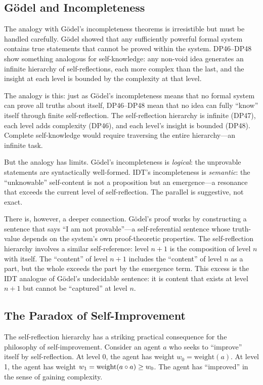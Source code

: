 \subsection{G\"odel and Incompleteness}

The analogy with G\"odel's incompleteness theorems is irresistible but must
be handled carefully.  G\"odel showed that any sufficiently powerful formal
system contains true statements that cannot be proved within the system.
DP46--DP48 show something analogous for self-knowledge: any non-void idea
generates an infinite hierarchy of self-reflections, each more complex than
the last, and the insight at each level is bounded by the complexity at that
level.

The analogy is this: just as G\"odel's incompleteness means that no formal
system can prove all truths about itself, DP46--DP48 mean that no idea can
fully ``know'' itself through finite self-reflection.  The self-reflection
hierarchy is infinite (DP47), each level adds complexity (DP46), and each
level's insight is bounded (DP48).  Complete self-knowledge would require
traversing the entire hierarchy---an infinite task.

But the analogy has limits.  G\"odel's incompleteness is \emph{logical}:
the unprovable statements are syntactically well-formed.  IDT's
incompleteness is \emph{semantic}: the ``unknowable'' self-content is not
a proposition but an emergence---a resonance that exceeds the current level
of self-reflection.  The parallel is suggestive, not exact.

There is, however, a deeper connection.  G\"odel's proof works by constructing
a sentence that says ``I am not provable''---a self-referential sentence whose
truth-value depends on the system's own proof-theoretic properties.  The
self-reflection hierarchy involves a similar self-reference: level $n+1$
is the composition of level $n$ with itself.  The ``content'' of level $n+1$
includes the ``content'' of level $n$ as a part, but the whole exceeds the
part by the emergence term.  This excess is the IDT analogue of G\"odel's
undecidable sentence: it is content that exists at level $n+1$ but cannot be
``captured'' at level $n$.

\subsection{The Paradox of Self-Improvement}

The self-reflection hierarchy has a striking practical consequence for the
philosophy of self-improvement.  Consider an agent $a$ who seeks to ``improve''
itself by self-reflection.  At level 0, the agent has weight $w_0 =
\mathrm{weight}(a)$.  At level 1, the agent has weight $w_1 =
\mathrm{weight}(a \circ a) \geq w_0$.  The agent has ``improved'' in the
sense of gaining complexity.

